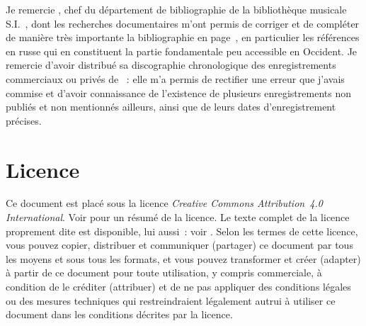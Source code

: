 Je remercie \LDedioukina{}, chef du département de bibliographie de la
bibliothèque musicale S.I.~\Taneiev{}, dont les recherches documentaires
m'ont permis de corriger et de compléter de manière très importante la
bibliographie en page~\pageref{chap:Bibliographie}, en particulier les
références en russe qui en constituent la partie fondamentale peu accessible
en Occident.
Je remercie \CJohansson{} d'avoir distribué sa discographie chronologique
des enregistrements commerciaux ou privés de \VSofronitsky{}~: elle m'a
permis de rectifier une erreur que j'avais commise et d'avoir connaissance
de l'existence de plusieurs enregistrements non publiés et non mentionnés
ailleurs, ainsi que de leurs dates d'enregistrement précises.

\section{Licence}

Ce document est placé sous la licence \emph{Creative Commons Attribution~4.0
International}.
Voir \citet{CCBYResume} pour un résumé de la licence.
Le texte complet de la licence proprement dite est disponible, lui aussi~:
voir \citet{CCBYComplet}.
Selon les termes de cette licence, vous pouvez copier, distribuer et
communiquer (partager) ce document par tous les moyens et sous tous les
formats, et vous pouvez transformer et créer (adapter) à partir de ce
document pour toute utilisation, y compris commerciale, à condition de le
créditer (attribuer) et de ne pas appliquer des conditions légales ou des
mesures techniques qui restreindraient légalement autrui à utiliser ce
document dans les conditions décrites par la licence.
